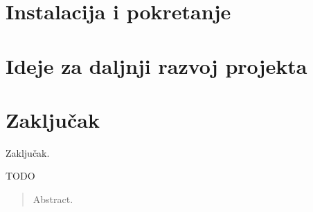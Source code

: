 \documentclass[times, utf8, zavrsni]{fer}
\begin{document}
\chapter{Instalacija i pokretanje}

\chapter{Ideje za daljnji razvoj projekta}

\chapter{Zaključak}
Zaključak.




\begin{sazetak}
TODO

\end{sazetak}

\begin{abstract}
Abstract.

\end{abstract}
\end{document}
